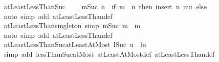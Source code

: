 \begin{isabellebody}
\begin{isamarkuptext}
\end{isamarkuptext}\isamarkuptrue%
\isamarkupfalse%
\ atLeastLessThanSuc{\isacharcolon}{\kern0pt}\isanewline
\ \ \ \ {\isachardoublequoteopen}{\isacharbraceleft}{\kern0pt}m{\isachardot}{\kern0pt}{\isachardot}{\kern0pt}{\isacharless}{\kern0pt}Suc\ n{\isacharbraceright}{\kern0pt}\ {\isacharequal}{\kern0pt}\ {\isacharparenleft}{\kern0pt}if\ m\ {\isasymle}\ n\ then\ insert\ n\ {\isacharbraceleft}{\kern0pt}m{\isachardot}{\kern0pt}{\isachardot}{\kern0pt}{\isacharless}{\kern0pt}n{\isacharbraceright}{\kern0pt}\ else\ {\isacharbraceleft}{\kern0pt}{\isacharbraceright}{\kern0pt}{\isacharparenright}{\kern0pt}{\isachardoublequoteclose}\isanewline
%
\isadelimproof
%
\endisadelimproof
%
\isatagproof
{}\isamarkupfalse%
\ {\isacharparenleft}{\kern0pt}auto\ simp\ add{\isacharcolon}{\kern0pt}\ atLeastLessThan{\isacharunderscore}{\kern0pt}def{\isacharparenright}{\kern0pt}%
\endisatagproof
{\isafoldproof}%
%
\isadelimproof
\isanewline
%
\endisadelimproof
\isanewline
{}\isamarkupfalse%
\ atLeastLessThan{\isacharunderscore}{\kern0pt}singleton\ {\isacharbrackleft}{\kern0pt}simp{\isacharbrackright}{\kern0pt}{\isacharcolon}{\kern0pt}\ {\isachardoublequoteopen}{\isacharbraceleft}{\kern0pt}m{\isachardot}{\kern0pt}{\isachardot}{\kern0pt}{\isacharless}{\kern0pt}Suc\ m{\isacharbraceright}{\kern0pt}\ {\isacharequal}{\kern0pt}\ {\isacharbraceleft}{\kern0pt}m{\isacharbraceright}{\kern0pt}{\isachardoublequoteclose}\isanewline
%
\isadelimproof
%
\endisadelimproof
%
\isatagproof
{}\isamarkupfalse%
\ {\isacharparenleft}{\kern0pt}auto\ simp\ add{\isacharcolon}{\kern0pt}\ atLeastLessThan{\isacharunderscore}{\kern0pt}def{\isacharparenright}{\kern0pt}%
\endisatagproof
{\isafoldproof}%
%
\isadelimproof
\isanewline
%
\endisadelimproof
\isanewline
{}\isamarkupfalse%
\ atLeastLessThanSuc{\isacharunderscore}{\kern0pt}atLeastAtMost{\isacharcolon}{\kern0pt}\ {\isachardoublequoteopen}{\isacharbraceleft}{\kern0pt}l{\isachardot}{\kern0pt}{\isachardot}{\kern0pt}{\isacharless}{\kern0pt}Suc\ u{\isacharbraceright}{\kern0pt}\ {\isacharequal}{\kern0pt}\ {\isacharbraceleft}{\kern0pt}l{\isachardot}{\kern0pt}{\isachardot}{\kern0pt}u{\isacharbraceright}{\kern0pt}{\isachardoublequoteclose}\isanewline
%
\isadelimproof
\ \ %
\endisadelimproof
%
\isatagproof
{}\isamarkupfalse%
\ {\isacharparenleft}{\kern0pt}simp\ add{\isacharcolon}{\kern0pt}\ lessThan{\isacharunderscore}{\kern0pt}Suc{\isacharunderscore}{\kern0pt}atMost\ atLeastAtMost{\isacharunderscore}{\kern0pt}def\ atLeastLessThan{\isacharunderscore}{\kern0pt}def{\isacharparenright}{\kern0pt}%

\end{isabellebody}
